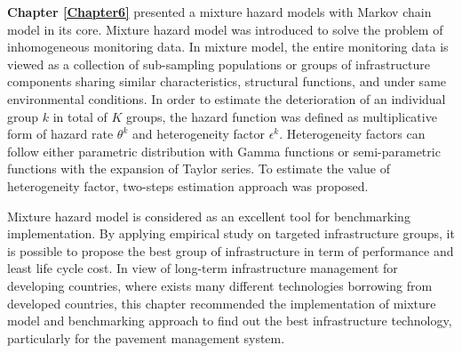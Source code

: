 \textbf{Chapter \ref{Chapter6}} presented a mixture hazard models with Markov chain model in its core. Mixture hazard model was introduced to solve the problem of inhomogeneous monitoring data. In mixture model, the entire monitoring data is viewed as a collection of sub-sampling populations or groups of infrastructure components sharing similar characteristics, structural functions, and under same environmental conditions. In order to estimate the deterioration of an individual group $k$ in total of $K$ groups, the hazard function was defined as multiplicative form of hazard rate $\theta^k$ and heterogeneity factor $\epsilon^k$. Heterogeneity factors can follow either parametric distribution with Gamma functions or semi-parametric functions with the expansion of Taylor series. To estimate the value of heterogeneity factor, two-steps estimation approach was proposed.

Mixture hazard model is considered as an excellent tool for benchmarking implementation. By applying empirical study on targeted infrastructure groups, it is possible to propose the best group of infrastructure in term of performance and least life cycle cost. In view of long-term infrastructure management for developing countries, where exists many different technologies borrowing from developed countries, this chapter recommended the implementation of mixture model and benchmarking approach to find out the best infrastructure technology, particularly for the pavement management system.

